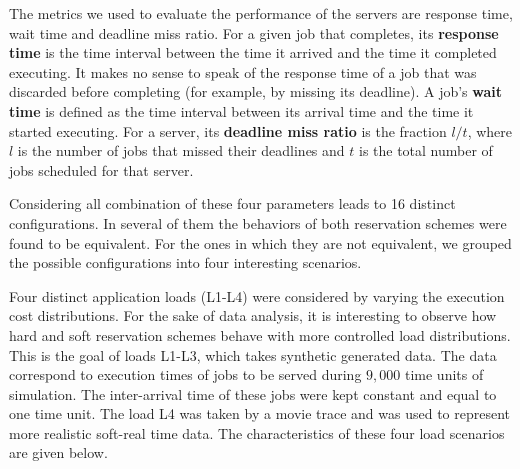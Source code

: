 \documentclass[times, 10pt,twocolumn]{article}
\begin{document}
The metrics we used to evaluate the performance of the servers are
response time, wait time and deadline miss ratio. For a given job that
completes, its \textbf{response time} is the time interval between the
time it arrived and the time it completed executing. It makes no sense
to speak of the response time of a job that was discarded before
completing (for example, by missing its deadline). A job's
\textbf{wait time} is defined as the time interval between its arrival
time and the time it started executing. For a server, its
\textbf{deadline miss ratio} is the fraction $l/t$, where $l$ is the
number of jobs that missed their deadlines and $t$ is the total number
of jobs scheduled for that server.

Considering all combination of these four parameters leads to 16
distinct configurations. In several of them the behaviors of both
reservation schemes were found to be equivalent.  For the ones in
which they are not equivalent, we grouped the possible configurations
into four interesting scenarios.

\label{sec:charact-server-load}

Four distinct application loads (L1-L4) were considered by varying the
execution cost distributions.  For the sake of data analysis, it is
interesting to observe how hard and soft reservation schemes behave
with more controlled load distributions. This is the goal of loads
L1-L3, which takes synthetic generated data. The data correspond to
execution times of jobs to be served during $9,000$ time units of
simulation.  The inter-arrival time of these jobs were kept constant
and equal to one time unit.  The load L4 was taken by a movie trace
and was used to represent more realistic soft-real time data. The
characteristics of these four load scenarios are given below.
\end{document}
